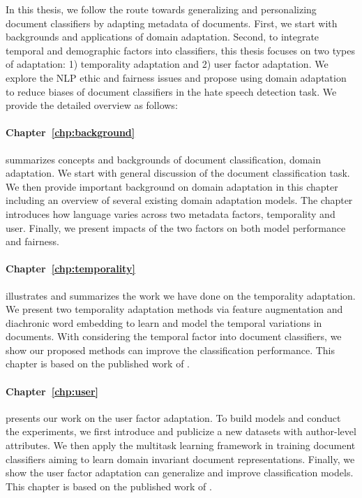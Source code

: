 In this thesis, we follow the route towards generalizing and personalizing document classifiers by adapting metadata of documents.
First, we start with backgrounds and applications of domain adaptation.
Second, to integrate temporal and demographic factors into classifiers, this thesis focuses on two types of adaptation: 1) temporality adaptation and 2) user factor adaptation.
We explore the NLP ethic and fairness issues and propose using domain adaptation to reduce biases of document classifiers in the hate speech detection task.
We provide the detailed overview as follows:

\paragraph{Chapter~\ref{chp:background}} summarizes concepts and backgrounds of document classification, domain adaptation. We start with general discussion of the document classification task. We then provide important background on domain adaptation in this chapter including an overview of several existing domain adaptation models. The chapter introduces how language varies across two metadata factors, temporality and user. Finally, we present impacts of the two factors on both model performance and fairness.

\paragraph{Chapter~\ref{chp:temporality}} illustrates and summarizes the work we have done on the temporality adaptation. We present two temporality adaptation methods via feature augmentation and diachronic word embedding to learn and model the temporal variations in documents. With considering the temporal factor into document classifiers, we show our proposed methods can improve the classification performance. This chapter is based on the published work of \cite{huang2018examining, huang2019neural}.

\paragraph{Chapter~\ref{chp:user}} presents our work on the user factor adaptation. To build models and conduct the experiments, we first introduce and publicize a new datasets with author-level attributes. We then apply the multitask learning framework in training document classifiers aiming to learn domain invariant document representations. Finally, we show the user factor adaptation can generalize and improve classification models. This chapter is based on the published work of \cite{huang2019neuraluser}.

